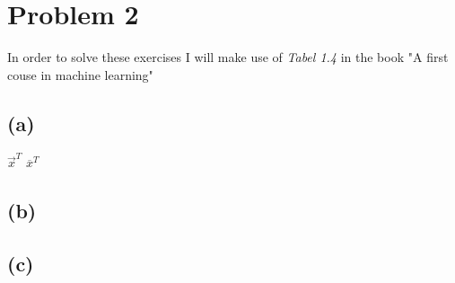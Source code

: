 \section{Problem 2}
In order to solve these exercises I will make use of \emph{Tabel 1.4} in the book "A first couse in machine learning"
\subsection{(a)}
$\overrightarrow{x}^{T}$
$\overline{x}^{T}$

\subsection{(b)}

\subsection{(c)}